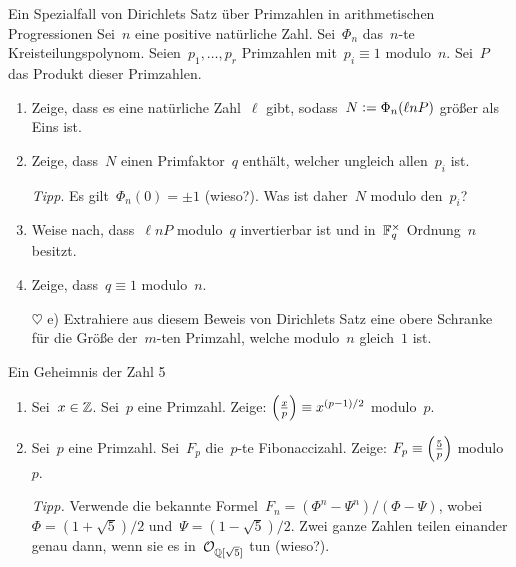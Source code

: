 \documentclass{uebblatt}
\begin{document}
\begin{aufgabe}{Ein Spezialfall von Dirichlets Satz über Primzahlen in arithmetischen
Progressionen}
Sei~$n$ eine positive natürliche Zahl. Sei~$\Phi_n$ das~$n$-te
Kreisteilungspolynom. Seien~$p_1,\ldots,p_r$ Primzahlen
mit~$p_i \equiv 1$ modulo~$n$. Sei~$P$ das Produkt dieser Primzahlen.
\begin{enumerate}
\item Zeige, dass es eine natürliche Zahl~$\ell$ gibt, sodass~$N \vcentcolon=
\Phi_n(\ell n P)$ größer als Eins ist.
\item Zeige, dass~$N$ einen Primfaktor~$q$ enthält, welcher ungleich
allen~$p_i$ ist.

{\tiny\emph{Tipp}. Es gilt~$\Phi_n(0) = \pm1$ (wieso?). Was ist daher~$N$
modulo den~$p_i$?\par}
\item Weise nach, dass~$\ell n P$ modulo~$q$ invertierbar ist und in~$\mathbb{F}_q^\times$
Ordnung~$n$ besitzt.
\item Zeige, dass~$q \equiv 1$ modulo~$n$.
\item[$\heartsuit$ e)] Extrahiere aus diesem Beweis von Dirichlets Satz eine
obere Schranke für die Größe der~$m$-ten Primzahl, welche modulo~$n$ gleich~$1$
ist.
\end{enumerate}
\end{aufgabe}

\begin{aufgabe}{Ein Geheimnis der Zahl 5}
\begin{enumerate}
\item Sei~$x \in \mathbb{Z}$. Sei~$p$ eine Primzahl. Zeige: $\left(\frac{x}{p}\right) \equiv
x^{(p-1)/2}$ modulo~$p$.
\item Sei~$p$ eine Primzahl. Sei~$F_p$ die~$p$-te Fibonaccizahl. Zeige: $F_p
\equiv \left(\frac{5}{p}\right)$ modulo~$p$.

{\tiny\emph{Tipp.} Verwende die bekannte Formel~$F_n = (\Phi^n - \Psi^n) /
(\Phi - \Psi)$, wobei~$\Phi = (1 + \sqrt{5})/2$ und~$\Psi = (1 - \sqrt{5})/2$.
Zwei ganze Zahlen teilen einander genau dann, wenn sie es
in~$\mathcal{O}_{\mathbb{Q}[\sqrt{5}]}$ tun (wieso?).\par}
\end{enumerate}
\end{aufgabe}
\end{document}
